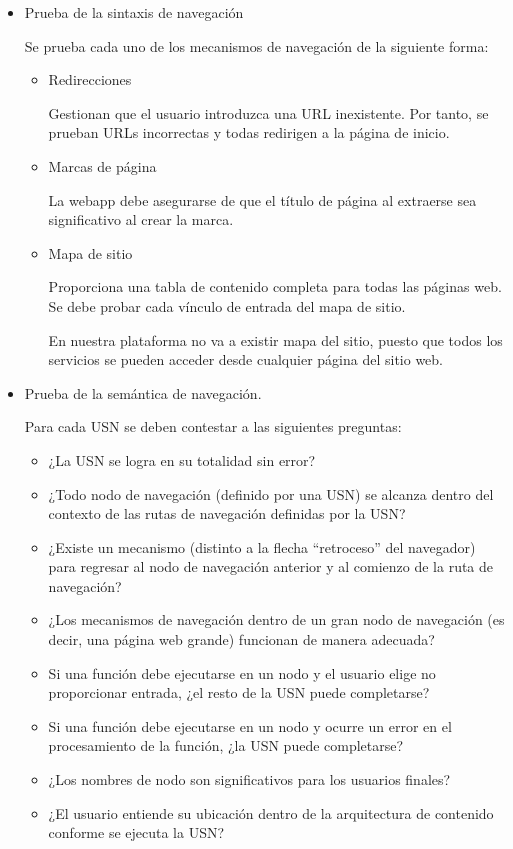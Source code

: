 \begin{itemize}
\item Prueba de la sintaxis de navegación



Se prueba cada uno de los mecanismos de navegación de la siguiente forma:


\begin{itemize}
\item Redirecciones


Gestionan que el usuario introduzca una URL inexistente.  Por tanto, se prueban URLs incorrectas y todas redirigen a la página de inicio.

\item Marcas de página


La webapp debe asegurarse de que el título de página al extraerse sea significativo al crear la marca.

\item Mapa de sitio


Proporciona una tabla de contenido completa para todas las páginas web. Se debe probar cada vínculo de entrada del mapa de sitio.



En nuestra plataforma no va a existir mapa del sitio, puesto que todos los servicios se pueden acceder desde cualquier página del sitio web.


\end{itemize}

\item Prueba de la semántica de navegación.


Para cada USN se deben contestar a las siguientes preguntas:


\begin{itemize}

\item ¿La USN se logra en su totalidad sin error? 
\item ¿Todo nodo de navegación (definido por una USN) se alcanza dentro del contexto de las rutas de navegación definidas por la USN? 
\item ¿Existe un mecanismo (distinto a la flecha ``retroceso'' del navegador) para regresar al nodo de navegación anterior y al comienzo de la ruta de navegación? 
\item ¿Los mecanismos de navegación dentro de un gran nodo de navegación (es decir, una página web grande) funcionan de manera adecuada? 
\item Si una función debe ejecutarse en un nodo y el usuario elige no proporcionar entrada, ¿el resto de la USN puede completarse? 
\item Si una función debe ejecutarse en un nodo y ocurre un error en el procesamiento de la función, ¿la USN puede completarse?
\item ¿Los nombres de nodo son significativos para los usuarios finales? 
\item ¿El usuario entiende su ubicación dentro de la arquitectura de contenido conforme se ejecuta la USN?
\end{itemize}
\end{itemize}

